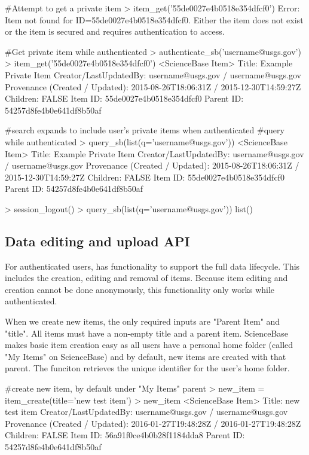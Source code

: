 \begin{example}
#Attempt to get a private item
> item_get('55de0027e4b0518e354dfcf0')
 Error: Item not found for ID=55de0027e4b0518e354dfcf0. Either the 
 item does not exist or the item is secured and requires authentication to access. 

#Get private item while authenticated
> authenticate_sb('username@usgs.gov')
> item_get('55de0027e4b0518e354dfcf0')
 <ScienceBase Item> 
  Title: Example Private Item
  Creator/LastUpdatedBy:     username@usgs.gov / username@usgs.gov
  Provenance (Created / Updated):  2015-08-26T18:06:31Z / 2015-12-30T14:59:27Z
  Children: FALSE
  Item ID: 55de0027e4b0518e354dfcf0
  Parent ID: 54257d8fe4b0e641df8b50af
  
#search expands to include user's private items when authenticated
#query while authenticated
> query_sb(list(q='username@usgs.gov'))
 <ScienceBase Item> 
  Title: Example Private Item
  Creator/LastUpdatedBy:     username@usgs.gov / username@usgs.gov
  Provenance (Created / Updated):  2015-08-26T18:06:31Z / 2015-12-30T14:59:27Z
  Children: FALSE
  Item ID: 55de0027e4b0518e354dfcf0
  Parent ID: 54257d8fe4b0e641df8b50af
  
> session_logout()
> query_sb(list(q='username@usgs.gov'))
list()
\end{example}


\subsection{Data editing and upload API}
For authenticated users,  has functionality to support 
the full data lifecycle. This includes the creation, editing and removal
of items. Because item editing and creation cannot be done anonymously, 
this functionality only works while authenticated.

When we create new items, the only required inputs are "Parent Item" and "title". All 
items must have a non-empty title and a parent item. ScienceBase makes basic item creation
easy as all users have a personal home folder (called "My Items" on ScienceBase) and by default,
new items are created with that parent. The funciton  retrieves the
unique identifier for the user's home folder. 

\begin{example}
#create new item, by default under "My Items" parent
> new_item = item_create(title='new test item')
> new_item
<ScienceBase Item> 
  Title: new test item
  Creator/LastUpdatedBy:     username@usgs.gov / username@usgs.gov
  Provenance (Created / Updated):  2016-01-27T19:48:28Z / 2016-01-27T19:48:28Z
  Children: FALSE
  Item ID: 56a91f0ce4b0b28f1184dda8
  Parent ID: 54257d8fe4b0e641df8b50af
\end{example}

